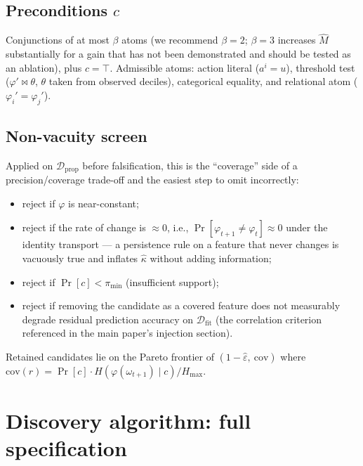 \documentclass[11pt]{article}
\theoremstyle{plain}
\theoremstyle{definition}
\theoremstyle{remark}
\begin{document}
\subsection{Preconditions $c$}
Conjunctions of at most $\beta$ atoms (we recommend $\beta=2$; $\beta=3$ increases $\hat M$ substantially for a gain that has not been demonstrated and should be tested as an ablation), plus $c=\top$. Admissible atoms: action literal ($a^i=u$), threshold test ($\varphi'\Join\theta$, $\theta$ taken from observed deciles), categorical equality, and relational atom ($\varphi_i'=\varphi_j'$).

\subsection{Non-vacuity screen}
\label{app:screen}
Applied on $\mathcal{D}_{\mathrm{prop}}$ before falsification, this is the ``coverage'' side of a precision/coverage trade-off and the easiest step to omit incorrectly:
\begin{itemize}
  \item reject if $\varphi$ is near-constant;
  \item reject if the rate of change is $\approx 0$, i.e., $\Pr[\varphi_{t+1}\neq\varphi_t]\approx0$ under the identity transport --- a persistence rule on a feature that never changes is vacuously true and inflates $\hat\kappa$ without adding information;
  \item reject if $\Pr[c] < \pi_{\min}$ (insufficient support);
  \item reject if removing the candidate as a covered feature does not measurably degrade residual prediction accuracy on $\mathcal{D}_{\mathrm{fit}}$ (the correlation criterion referenced in the main paper's injection section).
\end{itemize}
Retained candidates lie on the Pareto frontier of $(1-\hat\varepsilon,\ \mathrm{cov})$ where $\mathrm{cov}(r)=\Pr[c]\cdot H(\varphi(\omega_{t+1})\mid c)/H_{\max}$.

\section{Discovery algorithm: full specification}
\label{app:algo}
\end{document}
